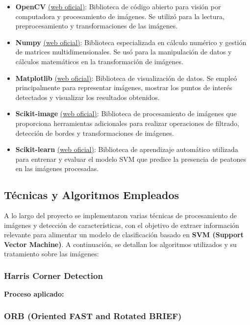 \documentclass[a4paper]{article}
\begin{document}
\begin{itemize}
\item \textbf{OpenCV} \href{https://opencv.org/}{(web oficial)}: Biblioteca de código abierto para visión por computadora y procesamiento de imágenes. Se utilizó para la lectura, preprocesamiento y transformaciones de las imágenes.
\item \textbf{Numpy} \href{https://numpy.org/}{(web oficial)}: Biblioteca especializada en cálculo numérico y gestión de matrices multidimensionales. Se usó para la manipulación de datos y cálculos matemáticos en la transformación de imágenes.
\item \textbf{Matplotlib} \href{https://matplotlib.org/}{(web oficial)}: Biblioteca de visualización de datos. Se empleó principalmente para representar imágenes, mostrar los puntos de interés detectados y visualizar los resultados obtenidos.
\item \textbf{Scikit-image} \href{https://scikit-image.org/}{(web oficial)}: Biblioteca de procesamiento de imágenes que proporciona herramientas adicionales para realizar operaciones de filtrado, detección de bordes y transformaciones de imágenes.
\item \textbf{Scikit-learn} \href{https://scikit-learn.org/}{(web oficial)}: Biblioteca de aprendizaje automático utilizada para entrenar y evaluar el modelo SVM que predice la presencia de peatones en las imágenes procesadas.
\end{itemize}

\subsection{Técnicas y Algoritmos Empleados}

A lo largo del proyecto se implementaron varias técnicas de procesamiento de imágenes y detección de características, con el objetivo de extraer información relevante para alimentar un modelo de clasificación basado en \textbf{SVM (Support Vector Machine)}. A continuación, se detallan los algoritmos utilizados y su tratamiento sobre las imágenes:

\subsubsection{Harris Corner Detection}


\textbf{Proceso aplicado:}


\subsubsection{ORB (Oriented FAST and Rotated BRIEF)}
\end{document}
